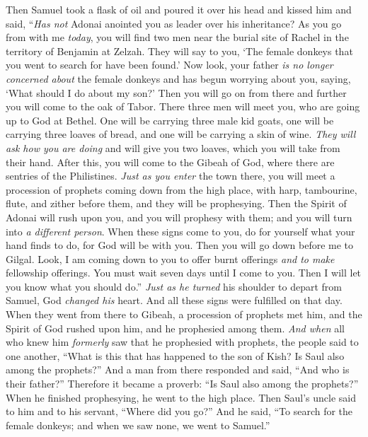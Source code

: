 \begin{biblechapter} %
 Then Samuel took a flask of oil and poured it over his head and kissed him and said, “\textit{Has not} Adonai anointed you as leader over his inheritance?
\verse As you go from with me \textit{today}, you will find two men near the burial site of Rachel in the territory of Benjamin at Zelzah. They will say to you, ‘The female donkeys that you went to search for have been found.’ Now look, your father \textit{is no longer concerned about} the female donkeys and has begun worrying about you, saying, ‘What should I do about my son?’
\verse Then you will go on from there and further you will come to the oak of Tabor. There three men will meet you, who are going up to God at Bethel. One will be carrying three male kid goats, one will be carrying three loaves of bread, and one will be carrying a skin of wine.
\verse \textit{They will ask how you are doing} and will give you two loaves, which you will take from their hand.
\verse After this, you will come to the Gibeah of God, where there are sentries of the Philistines. \textit{Just as you enter} the town there, you will meet a procession of prophets coming down from the high place, with harp, tambourine, flute, and zither before them, and they will be prophesying.
\verse Then the Spirit of Adonai will rush upon you, and you will prophesy with them; and you will turn into \textit{a different person}.
\verse When these signs come to you, do for yourself what your hand finds to do, for God will be with you.
\verse Then you will go down before me to Gilgal. Look, I am coming down to you to offer burnt offerings \textit{and to make} fellowship offerings. You must wait seven days until I come to you. Then I will let you know what you should do.”
\verse \textit{Just as he turned} his shoulder to depart from Samuel, God \textit{changed his} heart. And all these signs were fulfilled on that day.
\verse When they went from there to Gibeah, a procession of prophets met him, and the Spirit of God rushed upon him, and he prophesied among them.
\verse \textit{And when} all who knew him \textit{formerly} saw that he prophesied with prophets, the people said to one another, “What is this that has happened to the son of Kish? Is Saul also among the prophets?”
\verse And a man from there responded and said, “And who is their father?” Therefore it became a proverb: “Is Saul also among the prophets?”
\verse When he finished prophesying, he went to the high place.
\verse Then Saul’s uncle said to him and to his servant, “Where did you go?” And he said, “To search for the female donkeys; and when we saw none, we went to Samuel.”

\end{biblechapter}
